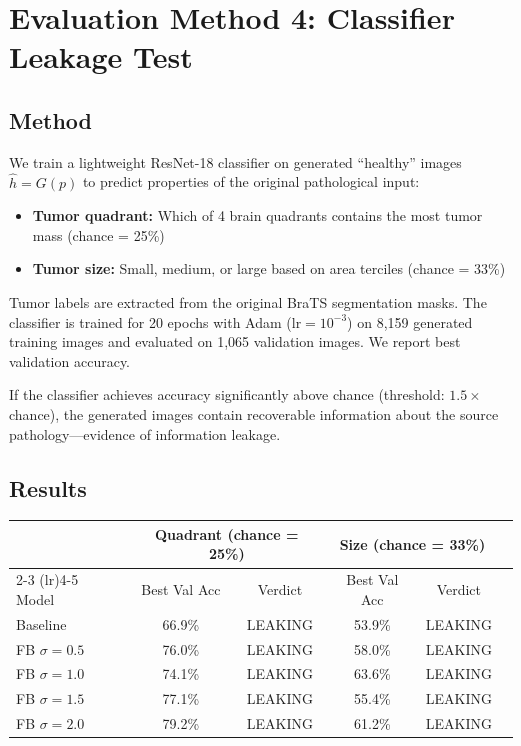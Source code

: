 \documentclass[11pt,a4paper]{article}
\theoremstyle{definition}
\begin{document}
\section{Evaluation Method 4: Classifier Leakage Test}
\label{sec:classifier}

\subsection{Method}

We train a lightweight ResNet-18 classifier on generated ``healthy'' images $\hat{h} = G(p)$ to predict properties of the original pathological input:
\begin{itemize}
    \item \textbf{Tumor quadrant:} Which of 4 brain quadrants contains the most tumor mass (chance = 25\%)
    \item \textbf{Tumor size:} Small, medium, or large based on area terciles (chance = 33\%)
\end{itemize}

Tumor labels are extracted from the original BraTS segmentation masks. The classifier is trained for 20 epochs with Adam ($\text{lr} = 10^{-3}$) on 8,159 generated training images and evaluated on 1,065 validation images. We report best validation accuracy.

If the classifier achieves accuracy significantly above chance (threshold: $1.5 \times$ chance), the generated images contain recoverable information about the source pathology---evidence of information leakage.

\subsection{Results}

\begin{center}
\begin{tabular}{lccccc}
\toprule
& \multicolumn{2}{c}{Quadrant (chance = 25\%)} & \multicolumn{2}{c}{Size (chance = 33\%)} \\
\cmidrule(lr){2-3} \cmidrule(lr){4-5}
Model & Best Val Acc & Verdict & Best Val Acc & Verdict \\
\midrule
Baseline & 66.9\% & LEAKING & 53.9\% & LEAKING \\
FB $\sigma=0.5$ & 76.0\% & LEAKING & 58.0\% & LEAKING \\
FB $\sigma=1.0$ & 74.1\% & LEAKING & 63.6\% & LEAKING \\
FB $\sigma=1.5$ & 77.1\% & LEAKING & 55.4\% & LEAKING \\
FB $\sigma=2.0$ & 79.2\% & LEAKING & 61.2\% & LEAKING \\
\bottomrule
\end{tabular}
\end{center}
\end{document}
